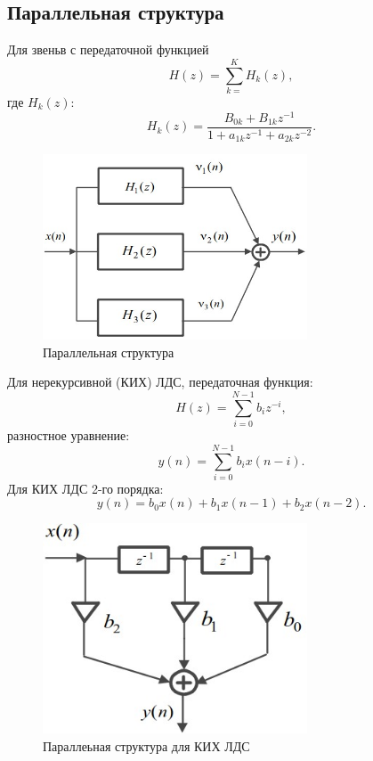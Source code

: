 \documentclass[a4paper, 14pt]{extarticle}
\begin{document}
\subsection{Параллельная структура}
Для звеньв с передаточной функцией
\begin{equation}
    H(z) = \sum^{K}_{k=} H_k(z),
\end{equation}
где $H_k(z)$:
\begin{equation}
    H_k(z) = \frac{B_{0k} + B_{1k}z^{-1}}{1+a_{1k}z^{-1}+a_{2k}z^{-2}}.
\end{equation}

\begin{figure}[h]
    \centering
    \includegraphics[width=0.7\textwidth]{img/S008.jpg}
    \caption{Параллельная структура}%
    \label{img:parr}
\end{figure}
\FloatBarrier{}

Для нерекурсивной (КИХ) ЛДС, передаточная функция:
\begin{equation}
    H(z) = \sum^{N-1}_{i=0} b_i z^{-i},
\end{equation}
разностное уравнение:
\begin{equation}
    y(n) = \sum^{N-1}_{i=0} b_i x(n-i).
\end{equation}
Для КИХ ЛДС 2-го порядка:
\begin{equation}
    y(n) = b_0 x(n) + b_1 x(n-1) + b_2 x(n-2).
\end{equation}

\begin{figure}[h]
    \centering
    \includegraphics[width=0.7\textwidth]{img/S009.jpg}
    \caption{Параллеьная структура для КИХ ЛДС}%
    \label{img:cons:kix}
\end{figure}
\end{document}
